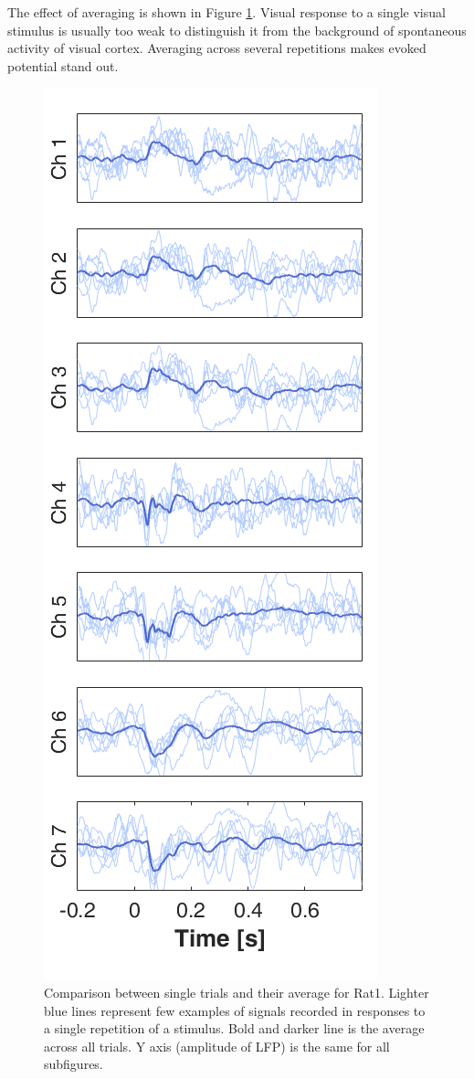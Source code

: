 \documentclass{pracalicmgr}
\begin{document}
   The effect of averaging is shown in Figure \ref{rys:usrednianie}. Visual response to a single visual stimulus is usually too weak to distinguish it from the background of spontaneous activity of visual cortex. Averaging across several repetitions makes evoked potential stand out.
   \begin{figure}[H]
   	\begin{center}
   		\includegraphics[scale=0.6]{usrednianie3.png}
   	\end{center}
   	\caption{ Comparison between single trials and their average for Rat1. Lighter blue lines represent few examples of signals recorded in responses to a single repetition of a stimulus. Bold and darker line is the average across all trials. Y axis (amplitude of LFP) is the same for all subfigures. }
   	\label{rys:usrednianie}
   \end{figure} 
   
\end{document}
